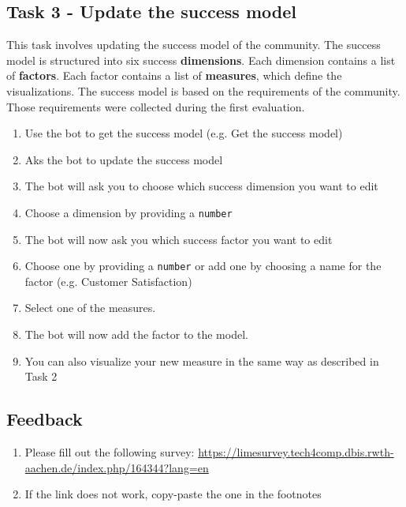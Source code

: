 \subsection*{Task 3 - Update the success model}
This task involves updating the success model of the community. The success model is structured into six success \textbf{dimensions}. Each dimension contains a list of \textbf{factors}. Each factor contains a list of \textbf{measures}, which define the visualizations.
The success model is based on the requirements of the community. Those requirements were collected during the first evaluation.
\begin{enumerate}
    \item Use the bot to get the success model (e.g. Get the success model)
    \item Aks the bot to update the success model
    \item The bot will ask you to choose which success dimension you want to edit
    \item Choose a dimension by providing a \texttt{number}
    \item The bot will now ask you which success factor you want to edit
    \item Choose one by providing a \texttt{number} or add one by choosing a name for the factor (e.g. Customer Satisfaction)
    \item Select one of the measures. 
    \item The bot will now add the factor to the model.
    \item You can also visualize your new measure in the same way as described in Task 2
\end{enumerate}

\subsection*{Feedback}
  
\begin{enumerate}
  \item Please fill out the following survey: \url{https://limesurvey.tech4comp.dbis.rwth-aachen.de/index.php/164344?lang=en}
  \item If the link does not work, copy-paste  the one in the footnotes \footnotemark 
\end{enumerate}